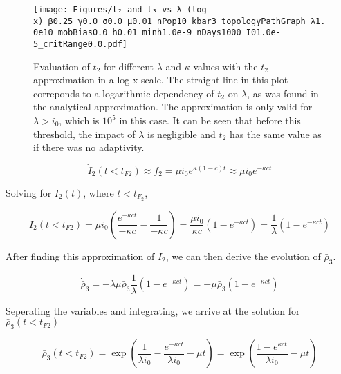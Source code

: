 \begin{figure}
    \centering
    \texttt{[image: Figures/t₂ and t₃ vs λ (log-x)\_β0.25\_γ0.0\_σ0.0\_μ0.01\_nPop10\_kbar3\_topologyPathGraph\_λ1.0e10\_mobBias0.0\_h0.01\_minh1.0e-9\_nDays1000\_I01.0e-5\_critRange0.0.pdf]}
    \caption{\small Evaluation of $t_2$ for different $\lambda$ and $\kappa$ values with the $t_2$ approximation in a log-x scale. The straight line in this plot correponds to a logarithmic dependency of $t_2$ on $\lambda$, as was found in the analytical approximation. The approximation is only valid for $\lambda > i_0$, which is $10^5$ in this case. It can be seen that before this threshold, the impact of $\lambda$ is negligible and $t_2$ has the same value as if there was no adaptivity.}
    \label{fig:t_2 and t_3 vs lambda}
\end{figure}

\begin{equation}\dot I_2(t<t_{F2}) \approx f_2 = \mu i_0 e^{\kappa (1-c) t} \approx \mu i_0 e^{-\kappa c t}\end{equation}

Solving for $I_2(t)$, where $t<t_{F_2}$,

\begin{equation}I_2(t<t_{F2}) = \mu i_0 \left( \frac{e^{-\kappa c t}}{-\kappa c} - \frac{1}{-\kappa c} \right) = \frac{\mu i_0}{\kappa c}\left(1 - e^{-\kappa c t}\right) = \frac{1}{\lambda}\left(1-e^{-\kappa c t}\right) \end{equation}

After finding this approximation of $I_2$, we can then derive the evolution of $\bar \rho_3$. 

\begin{equation}\dot{\bar{\rho}}_3 = - \lambda \mu \bar{\rho}_3 \frac{1}{\lambda}\left(1 - e^{-\kappa c t}\right) =  - \mu \bar{\rho}_3\left(1 - e^{-\kappa c t}\right)\end{equation}

Seperating the variables and integrating, we arrive at the solution for $\bar \rho_3(t<t_{F2})$ 


\begin{equation}\bar \rho_3(t<t_{F2}) = \exp\left( \frac{1}{\lambda i_0} - \frac{e^{-\kappa c t}}{\lambda i_0}-\mu t\right) = \exp\left(\frac{1-e^{\kappa c t}}{\lambda i_0} - \mu t \right)\end{equation}

